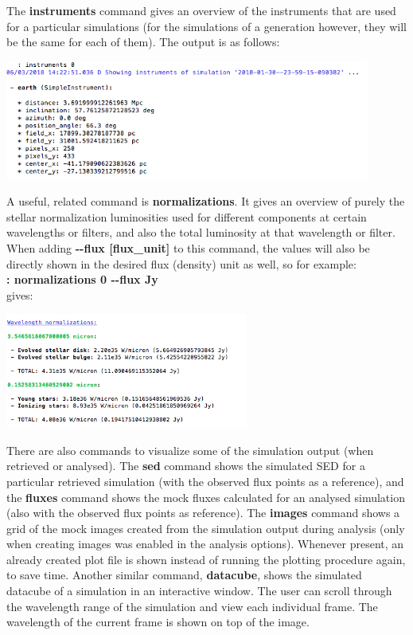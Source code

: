 \documentclass[15pt,a4paper,oneside,openright]{report}
\begin{document}
The \textbf{instruments} command gives an overview of the instruments that are used for a particular simulations (for the simulations of a generation however, they will be the same for each of them). The output is as follows:

\begin{center}
\includegraphics[width=0.9\textwidth]{figures/instruments.png}
\end{center}

A useful, related command is \textbf{normalizations}. It gives an overview of purely the stellar normalization luminosities used for different components at certain wavelengths or filters, and also the total luminosity at that wavelength or filter. When adding \textbf{-{}-flux [flux\_unit]} to this command, the values will also be directly shown in the desired flux (density) unit as well, so for example:\\

\textbf{: normalizations 0 -{}-flux Jy}\\

gives:

\begin{center}
\includegraphics[width=0.6\textwidth]{figures/normalizations.png}
\end{center}

There are also commands to visualize some of the simulation output (when retrieved or analysed). The \textbf{sed} command shows the simulated SED for a particular retrieved simulation (with the observed flux points as a reference), and the \textbf{fluxes} command shows the mock fluxes calculated for an analysed simulation (also with the observed flux points as reference). The \textbf{images} command shows a grid of the mock images created from the simulation output during analysis (only when creating images was enabled in the analysis options). Whenever present, an already created plot file is shown instead of running the plotting procedure again, to save time. Another similar command, \textbf{datacube}, shows the simulated datacube of a simulation in an interactive window. The user can scroll through the wavelength range of the simulation and view each individual frame. The wavelength of the current frame is shown on top of the image.
\end{document}
